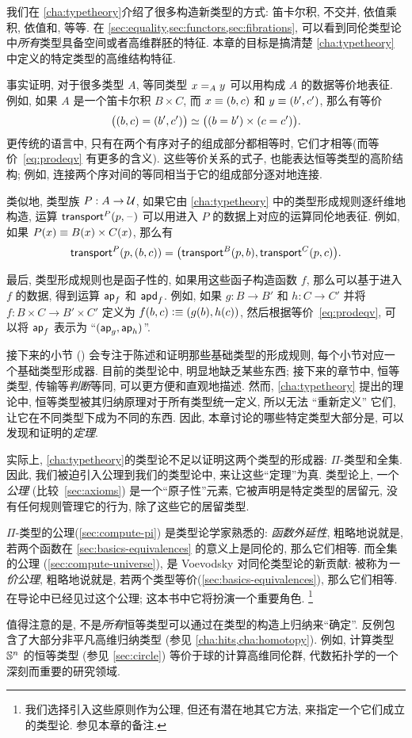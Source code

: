 我们在 \cref{cha:typetheory}介绍了很多构造新类型的方式: 笛卡尔积, 不交并, 依值乘积, 依值和, 等等.
在 \cref{sec:equality,sec:functors,sec:fibrations}, 可以看到同伦类型论中\emph{所有}类型具备空间或者高维群胚的特征.
本章的目标是搞清楚 \cref{cha:typetheory} 中定义的特定类型的高维结构特征.

事实证明, 对于很多类型 $A$, 等同类型 $\id[A]xy$ 可以用构成 $A$ 的数据等价地表征.
例如, 如果 $A$ 是一个笛卡尔积 $B\times C$, 而 $x\jdeq (b,c)$ 和 $y\jdeq(b',c')$, 那么有等价
\begin{equation}\label{eq:prodeqv}
  \eqv{\big((b,c)=(b',c')\big)}{\big((b=b')\times (c=c')\big)}.
\end{equation}
更传统的语言中, 只有在两个有序对子的组成部分都相等时, 它们才相等(而等价~\eqref{eq:prodeqv} 有更多的含义).
这些等价关系的式子, 也能表达恒等类型的高阶结构;
例如, 连接两个序对间的等同相当于它的组成部分逐对地连接.

类似地, 类型族 $P:A\to\type$, 如果它由 \cref{cha:typetheory} 中的类型形成规则逐纤维地构造, 运算 $\transfib{P}{p}{\blank}$ 可以用进入 $P$ 的数据上对应的运算同伦地表征.
例如, 如果 $P(x) \jdeq B(x)\times C(x)$, 那么有
\[\transfib{P}{p}{(b,c)} = \big(\transfib{B}{p}{b},\transfib{C}{p}{c}\big).\]

最后, 类型形成规则也是函子性的, 如果用这些函子构造函数 $f$, 那么可以基于进入 $f$ 的数据, 得到运算 $\apfunc f$ 和 $\apdfunc f$.
例如, 如果 $g:B\to B'$ 和 $h:C\to C'$ 并将 $f:B\times C \to B'\times C'$ 定义为 $f(b,c)\defeq (g(b),h(c))$, 然后根据等价~\eqref{eq:prodeqv}, 可以将 $\apfunc f$ 表示为 ``$(\apfunc g,\apfunc h)$''.

接下来的小节 () 会专注于陈述和证明那些基础类型的形成规则, 每个小节对应一个基础类型形成器.
目前的类型论中, 明显地缺乏某些东西;
接下来的章节中, 恒等类型, 传输等\emph{判断}等同, 可以更方便和直观地描述.
然而, \cref{cha:typetheory} 提出的理论中, 恒等类型被其归纳原理对于所有类型统一定义, 所以无法 ``重新定义'' 它们, 让它在不同类型下成为不同的东西.
因此, 本章讨论的哪些特定类型大部分是, 可以发现和证明的\emph{定理}.

实际上, \cref{cha:typetheory}的类型论不足以证明这两个类型的形成器: $\Pi$-类型和全集.
因此, 我们被迫引入公理到我们的类型论中, 来让这些``定理''为真.
类型论上, 一个\emph{公理} (比较~\cref{sec:axioms}) 是一个``原子性''元素, 它被声明是特定类型的居留元, 没有任何规则管理它的行为, 除了这些它的居留类型.
%

%
%
$\Pi$-类型的公理(\cref{sec:compute-pi}) 是类型论学家熟悉的: \emph{函数外延性}, 粗略地说就是, 若两个函数在 \cref{sec:basics-equivalences} 的意义上是同伦的, 那么它们相等.
而全集的公理 (\cref{sec:compute-universe}), 是 Voevodsky 对同伦类型论的新贡献: 被称为\emph{一价公理}, 粗略地说就是, 若两个类型等价(\cref{sec:basics-equivalences}), 那么它们相等.
在导论中已经见过这个公理; 这本书中它将扮演一个重要角色.%
\footnote{我们选择引入这些原则作为公理, 但还有潜在地其它方法, 来指定一个它们成立的类型论.
  参见本章的备注.}

值得注意的是, 不是\emph{所有}恒等类型可以通过在类型的构造上归纳来``确定''.
反例包含了大部分非平凡高维归纳类型 (参见 \cref{cha:hits,cha:homotopy}).
例如, 计算类型 $\Sn^n$ 的恒等类型 (参见 \cref{sec:circle}) 等价于球的计算高维同伦群, 代数拓扑学的一个深刻而重要的研究领域.